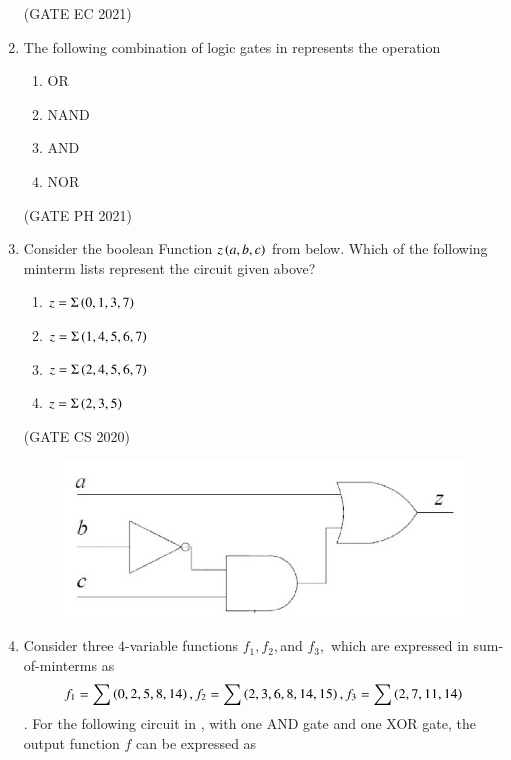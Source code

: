 \begin{enumerate}[label=\arabic*.,ref=\theenumi]
\hfill(GATE EC 2021)  
\begin{figure}[H]
	\centering
	\resizebox{0.75\columnwidth}{!}{

	}
\caption{} 
\label{fig:block_diagram}
\end{figure}
\item  The following combination of logic gates
in
	represents the operation
	\begin{enumerate}
       \item OR
       \item NAND
       \item AND
       \item NOR
   \end{enumerate}
%
 \hfill(GATE PH 2021)
	      \begin{figure}[H]
		      \centering
		      \resizebox{0.25\columnwidth}{!}{%
		      
		      }
	              \caption{}
		      \label{fig:GATE PH 2021}
	      \end{figure}
%
\item Consider the boolean Function $z\left(a,b,c\right)$ from 
			 below.
		Which of the following minterm lists represent the circuit given above?
	\begin{enumerate}
		\item $z=\Sigma\left(0,1,3,7\right)$
		\item $z=\Sigma\left(1,4,5,6,7\right)$
		\item $z=\Sigma\left(2,4,5,6,7\right)$
		\item $z=\Sigma\left(2,3,5\right)$
	\end{enumerate}	   
	\hfill{(GATE CS 2020)}
%	
		\begin{figure}[H]
			\centering
			\includegraphics[width=0.5\columnwidth]{figs/203.png}
			\caption{}
			\label{fig:203}
		\end{figure}
%
\item Consider three $4$-variable functions $f_1, f_2, $and $f_3,$ which are expressed in sum-of-minterms as 
$$f_1 = \sum\left(0,2,5,8,14\right), f_2=\sum\left(2,3,6,8,14,15\right), f_3 = \sum\left(2,7,11,14\right)$$. For the following circuit 
	in 
	,
	with one AND gate and one XOR gate, the output function $f$ can be expressed as

\end{enumerate}
